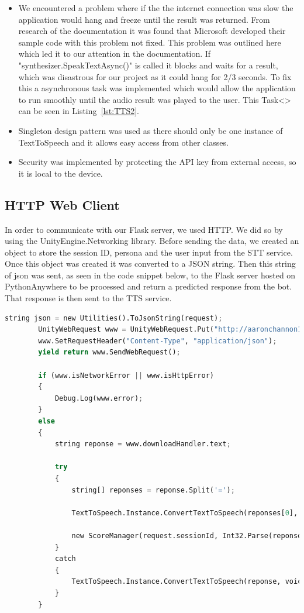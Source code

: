 \begin{itemize}
  \item We encountered a problem where if the the internet connection was slow the application would hang and freeze until the result was returned. From research of the documentation it was found that Microsoft developed their sample code with this problem not fixed. This problem was outlined here \cite{stackoverflow} which led it to our attention in the documentation. If "synthesizer.SpeakTextAsync()" is called it blocks and waits for a result, which was disastrous for our project as it could hang for 2/3 seconds. To fix this a asynchronous task was implemented which would allow the application to run smoothly until the audio result was played to the user. This Task<> can be seen in Listing~\ref{lst:TTS2}.
  \item Singleton design pattern was used as there should only be one instance of TextToSpeech and it allows easy access from other classes.
  \item Security was implemented by protecting the API key from external access, so it is local to the device.
\end{itemize}

\subsection{HTTP Web Client}
In order to communicate with our Flask server, we used HTTP. We did so by using the UnityEngine.Networking library. Before sending the data, we created an object to store the session ID, persona and the user input from the STT service. Once this object was created it was converted to a JSON string. Then this string of json was sent, as seen in the code snippet below, to the Flask server hosted on PythonAnywhere to be processed and return a predicted response from the bot. That response is then sent to the TTS service.

\newpage
\begin{lstlisting}[language=python]
        string json = new Utilities().ToJsonString(request);
        UnityWebRequest www = UnityWebRequest.Put("http://aaronchannon1.pythonanywhere.com/request", json);
        www.SetRequestHeader("Content-Type", "application/json");
        yield return www.SendWebRequest();

        if (www.isNetworkError || www.isHttpError)
        {
            Debug.Log(www.error);
        }
        else
        {
            string reponse = www.downloadHandler.text;

            try
            {
                string[] reponses = reponse.Split('=');

                TextToSpeech.Instance.ConvertTextToSpeech(reponses[0], voiceName, false);

                new ScoreManager(request.sessionId, Int32.Parse(reponses[1]), request.userInput, reponses[0]).UpdateScore();
            }
            catch
            { 
                TextToSpeech.Instance.ConvertTextToSpeech(reponse, voiceName, false);
            }
        }
\end{lstlisting}

